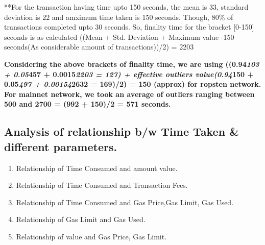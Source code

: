 \documentclass[11pt]{article}
\providecommand{\tightlist}{%
      \setlength{\itemsep}{0pt}\setlength{\parskip}{0pt}}
\begin{document}
    **For the transaction having time upto 150 seconds, the mean is 33,
standard deviation is 22 and amximum time taken is 150 seconds. Though,
80\% of transactions completed upto 30 seconds. So, finality time for
the bracket {[}0-150{]} seconds is as calculated ((Mean + Std. Deviation
+ Maximum value -150 seconds(As considerable amount of transactions))/2)
= 2203

    \textbf{Considering the above brackets of finality time, we are using
((0.94\emph{103 + 0.05}457 + 0.0015\emph{2203 = 127) + effective
outliers value(0.94}150 + 0.05\emph{497 + 0.00154}2632 = 169)/2) = 150
(approx) for ropsten network. For mainnet network, we took an average of
outliers ranging between 500 and 2700 = (992 + 150)/2 = 571 seconds.}

    \subsection{Analysis of relationship b/w Time Taken \& different
parameters.}\label{analysis-of-relationship-bw-time-taken-different-parameters.}

    \begin{enumerate}
\def\labelenumi{\arabic{enumi}.}
\tightlist
\item
  Relationship of Time Consumed and amount value.
\item
  Relationship of Time Consumed and Transaction Fees.
\item
  Relationship of Time Consumed and Gas Price,Gas Limit, Gas Used.
\item
  Relationship of Gas Limit and Gas Used.
\item
  Relationship of value and Gas Price, Gas Limit.
\end{enumerate}
\end{document}
